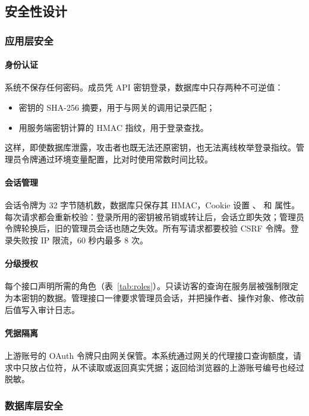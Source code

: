 \subsection{安全性设计}

\subsubsection{应用层安全}

\paragraph{身份认证}
系统不保存任何密码。成员凭 API 密钥登录，数据库中只存两种不可逆值：
\begin{itemize}
  \item 密钥的 SHA-256 摘要，用于与网关的调用记录匹配；
  \item 用服务端密钥计算的 HMAC 指纹，用于登录查找。
\end{itemize}
这样，即使数据库泄露，攻击者也既无法还原密钥，也无法离线枚举登录指纹。管理员令牌通过环境变量配置，比对时使用常数时间比较。

\paragraph{会话管理}
会话令牌为 32 字节随机数，数据库只保存其 HMAC，Cookie 设置 、 和  属性。每次请求都会重新校验：登录所用的密钥被吊销或转让后，会话立即失效；管理员令牌轮换后，旧的管理员会话也随之失效。所有写请求都要校验 CSRF 令牌。登录失败按 IP 限流，60 秒内最多 8 次。

\paragraph{分级授权}
每个接口声明所需的角色（表~\ref{tab:roles}）。只读访客的查询在服务层被强制限定为本密钥的数据。管理接口一律要求管理员会话，并把操作者、操作对象、修改前后值写入审计日志。

\paragraph{凭据隔离}
上游账号的 OAuth 令牌只由网关保管。本系统通过网关的代理接口查询额度，请求中只放占位符，从不读取或返回真实凭据；返回给浏览器的上游账号编号也经过脱敏。

\subsubsection{数据库层安全}

